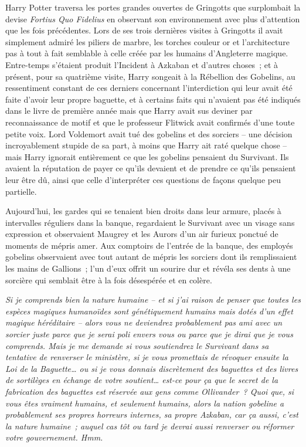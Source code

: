Harry Potter traversa les portes grandes ouvertes de Gringotts que surplombait la devise \emph{Fortius Quo Fidelius} en observant son environnement avec plus d'attention que les fois précédentes.
Lors de ses trois dernières visites à Gringotts il avait simplement admiré les piliers de marbre, les torches couleur or et l'architecture pas à tout à fait semblable à celle créée par les humains d'Angleterre magique.
Entre-temps s'étaient produit l'Incident à Azkaban et d'autres choses~; et à présent, pour sa quatrième visite, Harry songeait à la Rébellion des Gobelins, au ressentiment constant de ces derniers concernant l'interdiction qui leur avait été faite d'avoir leur propre baguette, et à certains faits qui n'avaient pas été indiqués dans le livre de première année mais que Harry avait sus deviner par reconnaissance de motif et que le professeur Flitwick avait confirmés d'une toute petite voix.
Lord Voldemort avait tué des gobelins et des sorciers -- une décision incroyablement stupide de sa part, à moins que Harry ait raté quelque chose -- mais Harry ignorait entièrement ce que les gobelins pensaient du Survivant.
Ils avaient la réputation de payer ce qu'ils devaient et de prendre ce qu'ils pensaient leur être dû, ainsi que celle d'interpréter ces questions de façons quelque peu partielle.

Aujourd'hui, les gardes qui se tenaient bien droits dans leur armure, placés à intervalles réguliers dans la banque, regardaient le Survivant avec un visage sans expression et observaient Maugrey et les Aurors d'un air furieux ponctué de moments de mépris amer.
Aux comptoirs de l'entrée de la banque, des employés gobelins observaient avec tout autant de mépris les sorciers dont ils remplissaient les mains de Gallions~; l'un d'eux offrit un sourire dur et révéla ses dents à une sorcière qui semblait être à la fois désespérée et en colère.

\emph{Si je comprends bien la nature humaine -- et si j'ai raison de penser que toutes les espèces magiques humanoïdes sont génétiquement humains mais dotés d'un effet magique héréditaire -- alors vous ne deviendrez probablement pas ami avec un sorcier juste parce que je serai poli envers vous ou parce que je dirai que je vous comprends.
Mais je me demande si vous soutiendrez le Survivant dans sa tentative de renverser le ministère, si je vous promettais de révoquer ensuite la Loi de la Baguette… ou si je vous donnais discrètement des baguettes et des livres de sortilèges en échange de votre soutient… est-ce pour ça que le secret de la fabrication des baguettes est réservée aux gens comme Ollivander~?
Quoi que, si vous êtes vraiment humains, et seulement humains, alors la nation gobeline a probablement ses propres horreurs internes, sa propre Azkaban, car ça aussi, c'est la nature humaine~; auquel cas tôt ou tard je devrai aussi renverser ou réformer votre gouvernement.
Hmm.}

